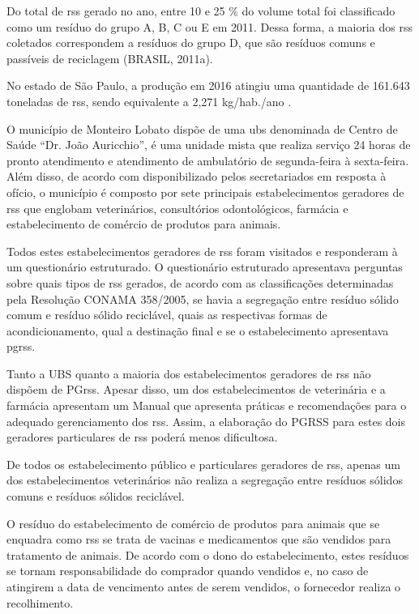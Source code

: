 	Do total de \gls{rss} gerado no ano, entre 10 e 25 \% do volume total foi classificado como um resíduo do grupo A, B, C ou E em 2011. Dessa forma, a maioria dos \gls{rss} coletados correspondem a resíduos do grupo D, que são resíduos comuns e passíveis de reciclagem (BRASIL, 2011a).
	
	
	No estado de São Paulo, a produção em 2016 atingiu uma quantidade de 161.643 toneladas de \gls{rss}, sendo equivalente a 2,271 kg/hab./ano \cite{abrelpe:2016}.
	
	O município de Monteiro Lobato dispõe de uma \gls{ubs} denominada de Centro de Saúde “Dr. João Auricchio”, é uma unidade mista que realiza serviço 24 horas de pronto atendimento e atendimento de ambulatório de segunda-feira à sexta-feira. Além disso, de acordo com disponibilizado pelos secretariados em resposta à ofício, o município é composto por sete principais estabelecimentos geradores de \gls{rss} que englobam veterinários, consultórios odontológicos, farmácia e estabelecimento de comércio de produtos para animais. 
	
	Todos estes estabelecimentos geradores de \gls{rss} foram visitados e responderam à um questionário estruturado. O questionário estruturado apresentava perguntas sobre quais tipos de \gls{rss} gerados, de acordo com as classificações determinadas pela Resolução CONAMA 358/2005, se havia a segregação entre resíduo sólido comum e resíduo sólido reciclável, quais as respectivas formas de acondicionamento, qual a destinação final e se o estabelecimento apresentava \gls{pgrss}.
	
	Tanto a UBS quanto a maioria dos estabelecimentos geradores de 
    \gls{rss} não dispõem de PG\gls{rss}. Apesar disso, um dos estabelecimentos de veterinária e a farmácia apresentam um Manual que apresenta práticas e recomendações para o adequado gerenciamento dos \gls{rss}. Assim, a elaboração do PGRSS para estes dois geradores particulares de \gls{rss} poderá menos dificultosa.
	
	De todos os estabelecimento público e particulares geradores de \gls{rss}, apenas um dos estabelecimentos veterinários não realiza a segregação entre resíduos sólidos comuns e resíduos sólidos reciclável.
	
	O resíduo do estabelecimento de comércio de produtos para animais que se enquadra como \gls{rss} se trata de vacinas e medicamentos que são vendidos para tratamento de animais. De acordo com o dono do estabelecimento, estes resíduos se tornam responsabilidade do comprador quando vendidos e, no caso de atingirem a data de vencimento antes de serem vendidos, o fornecedor realiza o recolhimento.
	
